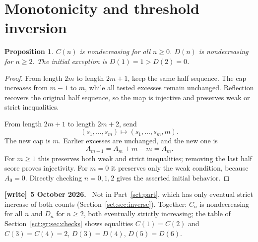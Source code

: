 \documentclass[11pt,letterpaper]{article}
\newtheorem{proposition}[theorem]{Proposition}
\theoremstyle{definition}\newtheorem{remark}[theorem]{Remark}
\newenvironment{writenote}[1][]{\par\smallskip\begingroup\small
 \noindent\textbf{[write]}\if\relax\detokenize{#1}\relax\else~\textbf{#1.}\fi\ }%
 {\par\endgroup\smallskip}
\begin{document}
\section{Monotonicity and threshold inversion}\label{sct:gr:sec:inverse}

\begin{proposition}\label{sct:gr:prop:mono}
$C(n)$ is nondecreasing for all $n\ge0$. $D(n)$ is nondecreasing for $n\ge2$.
The initial exception is $D(1)=1>D(2)=0$.
\end{proposition}

\begin{proof}
From length $2m$ to length $2m+1$, keep the same half sequence. The cap increases
from $m-1$ to $m$, while all tested excesses remain unchanged. Reflection
recovers the original half sequence, so the map is injective and preserves
weak or strict inequalities.

From length $2m+1$ to length $2m+2$, send
\[
 (s_1,\ldots,s_m)\longmapsto(s_1,\ldots,s_m,m).
\]
The new cap is $m$. Earlier excesses are unchanged, and the new one is
\[
 A_{m+1}=A_m+m-m=A_m.
\]
For $m\ge1$ this preserves both weak and strict inequalities; removing the
last half score proves injectivity. For $m=0$ it preserves only the weak
condition, because $A_0=0$. Directly checking $n=0,1,2$ gives the asserted
initial behavior.
\end{proof}
\begin{writenote}[5 October 2026]
Not in Part~\ref{sct:part}, which has only eventual strict increase of both counts (Section~\ref{sct:sec:inverse}). Together: $C_n$ is nondecreasing for all $n$ and $D_n$ for $n\ge2$, both eventually strictly increasing; the table of Section~\ref{sct:gr:sec:checks} shows equalities $C(1)=C(2)$ and $C(3)=C(4)=2$, $D(3)=D(4)$, $D(5)=D(6)$.
\end{writenote}
\end{document}
